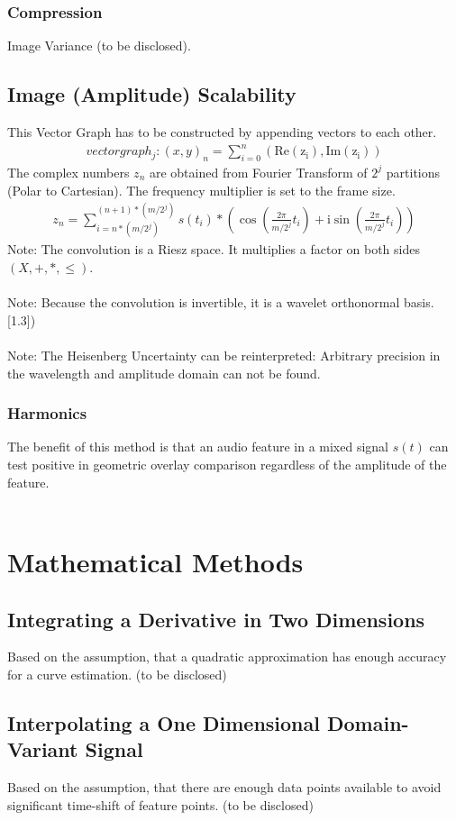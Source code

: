 \documentclass{report}
\begin{document}
\subsection{Compression}
Image Variance (to be disclosed).
\section{Image (Amplitude) Scalability}
This Vector Graph has to be constructed by appending vectors to each other.
\begin{align}
vectorgraph_{j}: (x,y)_{n}=\sum \limits _{i=0}^{n}(\mathrm{Re(z_{i})},\mathrm{Im(z_{i})})
\end{align}
The complex numbers $z_{n}$ are obtained from Fourier Transform of $2^j$ partitions (Polar to Cartesian). The frequency multiplier is set to the frame size.
\begin{align}
z_{n}= \sum \limits _{i=n*(m/2^j)}^{(n+1)*(m/2^j)} s(t_{i})*(\cos(\frac{2\pi}{m/2^j}t_{i})+\mathrm{i}\sin(\frac{2\pi}{m/2^j}t_{i}))\label{eq:3}
\end{align}
Note: The convolution is a Riesz space. It multiplies a factor on both sides $(X,+,*,\leq)$.\\\\
Note: Because the convolution is invertible, it is a wavelet orthonormal basis. \cite{Mallat}[1.3])\\\\
Note: The Heisenberg Uncertainty can be reinterpreted: Arbitrary precision in the wavelength and amplitude domain can not be found.
\subsection{Harmonics}
The benefit of this method is that an audio feature in a mixed signal $s(t)$ can test positive in geometric overlay comparison regardless of the amplitude of the feature.\\\\
\cite{Mallat}

\chapter{Mathematical Methods}
\section{Integrating a Derivative in Two Dimensions}
Based on the assumption, that a quadratic approximation has enough accuracy for a curve estimation. (to be disclosed)
\section{Interpolating a One Dimensional Domain-Variant Signal}
Based on the assumption, that there are enough data points available to avoid significant time-shift of feature points. (to be disclosed)

\iffalse
\printbibliography
\fi
{}

\end{document}
